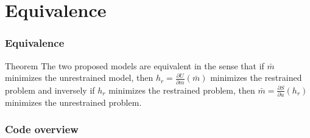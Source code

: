 \documentclass[utf8,aspectratio=169,ngerman,english]{beamer}
\begin{document}
\section{Equivalence}
\begin{frame}
\frametitle{Equivalence}
\begin{block}{Theorem}
 The two proposed models are equivalent in the sense that if $\bar m$ minimizes the unrestrained model, then $h_r = \frac{\partial U}{\partial m}(\bar m)$ minimizes the restrained problem and inversely if $h_r$ minimizes the restrained problem, then $\bar m = \frac{\partial S}{\partial u}(h_r)$ minimizes the unrestrained problem.
\end{block}

\end{frame}

\begin{frame}
 \frametitle{Code overview}

\end{frame}
\end{document}
